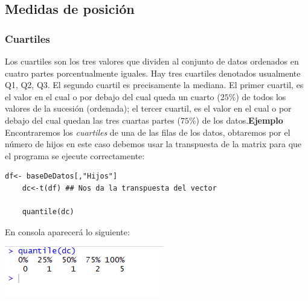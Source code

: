 \documentclass[12pt,hidelinks]{article}
\begin{document}
	\subsection{Medidas de posición}
	\subsubsection{Cuartiles}
	Los cuartiles son los tres valores que dividen al conjunto de datos ordenados en cuatro partes porcentualmente iguales. Hay tres cuartiles denotados usualmente Q1, Q2, Q3. El segundo cuartil es precisamente la mediana. El primer cuartil, es el valor en el cual o por debajo del cual queda un cuarto ($25\%$) de todos los valores de la sucesión (ordenada); el tercer cuartil, es el valor en el cual o por debajo del cual quedan las tres cuartas partes ($75\%$) de los datos.\textbf{Ejemplo} Encontraremos los \textit{cuartiles} de una de las filas de los datos, obtaremos por el número de hijos en este caso debemos usar la transpuesta de la matrix para que el programa se ejecute correctamente:
	\begin{lstlisting}[frame=single]
	df<- baseDeDatos[,"Hijos"]
	dc<-t(df) ## Nos da la transpuesta del vector
	
	quantile(dc)
	\end{lstlisting}
	En consola aparecerá lo siguiente:
	\begin{center}
		\includegraphics[]{Cuartiles.PNG}
	\end{center}
\end{document}
